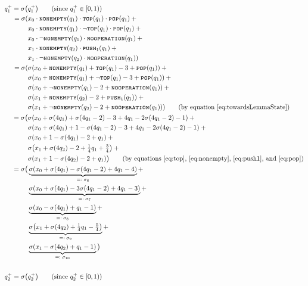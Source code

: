 \documentclass{book}
\newcommand{\eqdef}{=\vcentcolon}
\newcommand{\pushone}{\texttt{\textsc{push}}\textsubscript{\texttt{1}}}
\newcommand{\nonempty}{\textsc{\texttt{nonempty}}}
\newcommand{\tos}{\textsc{\texttt{top}}}
\newcommand{\pop}{\textsc{\texttt{pop}}}
\newcommand{\noop}{\textsc{\texttt{nooperation}}}
\theoremstyle{definition}
\theoremstyle{plain}
\theoremstyle{plain}
\theoremstyle{remark}
\theoremstyle{plain}
\begin{document}
\begin{align*}
		q_1^+=\sigma\big(&q_1^+\big) \tag{since $q_1^+\in[0,1)$} \\
		     =\sigma(&x_0\cdot\nonempty(q_1)\cdot\tos(q_1)\cdot\pop(q_1)\:+ \\
				     &x_0\cdot\nonempty(q_1)\cdot\lnot\tos(q_1)\cdot\pop(q_1)\:+ \\
				     &x_0\cdot\lnot\nonempty(q_1)\cdot\noop(q_1)\:+ \\
				     &x_1\cdot\nonempty(q_2)\cdot\pushone(q_1)\:+ \\
				     &x_1\cdot\lnot\nonempty(q_2)\cdot\noop(q_1)) \\
			 =\sigma(&\sigma(x_0+\nonempty(q_1)+\tos(q_1)-3+\pop(q_1))\:+ \\
					 &\sigma(x_0+\nonempty(q_1)+\lnot\tos(q_1)-3+\pop(q_1))\:+ \\
					 &\sigma(x_0+\lnot\nonempty(q_1)-2+\noop(q_1))\:+ \\
					 &\sigma(x_1+\nonempty(q_2)-2+\pushone(q_1))\:+ \\
					 &\sigma(x_1+\lnot\nonempty(q_2)-2+\noop(q_1))) \tag{by equation \ref{eq:towardsLemmaState}} \\
			 =\sigma\big(&\sigma(x_0+\sigma(4q_1)+\sigma(4q_1-2)-3+4q_1-2\sigma(4q_1-2)-1)\:+ \\
					 &\sigma(x_0+\sigma(4q_1)+1-\sigma(4q_1-2)-3+4q_1-2\sigma(4q_1-2)-1)\:+ \\
					 &\sigma(x_0+1-\sigma(4q_1)-2+q_1)\:+ \\
					 &\sigma\big(x_1+\sigma(4q_2)-2+\textstyle{\frac{1}{4}}q_1+\textstyle{\frac{3}{4}}\big)\:+ \\
					 &\sigma(x_1+1-\sigma(4q_2)-2+q_1)\big) \tag{by equations \ref{eq:top}, \ref{eq:nonempty}, \ref{eq:push1}, and \ref{eq:pop}} \\
			 =\sigma\big(&\underbrace{\sigma(x_0+\sigma(4q_1)-\sigma(4q_1-2)+4q_1-4)}_\text{$\eqdef\sigma_6$}+ \\
					 &\underbrace{\sigma(x_0+\sigma(4q_1)-3\sigma(4q_1-2)+4q_1-3)}_\text{$\eqdef\sigma_7$}+ \\
					 &\underbrace{\sigma(x_0-\sigma(4q_1)+q_1-1)}_\text{$\eqdef\sigma_8$}+ \\
					 &\underbrace{\sigma\big(x_1+\sigma(4q_2)+\textstyle{\frac{1}{4}}q_1-\textstyle{\frac{5}{4}}\big)}_\text{$\eqdef\sigma_9$}+ \\
					 &\underbrace{\sigma(x_1-\sigma(4q_2)+q_1-1)}_\text{$\eqdef\sigma_{10}$}\big) \\\\
		q_2^+=\sigma\big(&q_2^+\big) \tag{since $q_2^+\in[0,1)$} \\

\end{align*}
\end{document}
